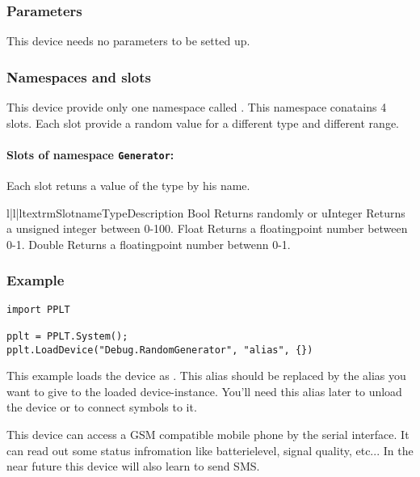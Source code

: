 \subsubsection{Parameters}
This device needs no parameters to be setted up. 

\subsubsection{Namespaces and slots}
This device provide only one namespace called . This 
namespace conatains 4 slots. Each slot provide a random value for a different
type and different range.

\paragraph{Slots of namespace \texttt{Generator}:}
Each slot retuns a value of the type by his name.
\begin{tableiii}{l|l|l}{textrm}{Slotname}{Type}{Description}
        {Bool}
        {Returns randomly  or }
        {uInteger}
        {Returns a unsigned integer between 0-100.}
        {Float}
        {Returns a floatingpoint number between 0-1.}
        {Double}
        {Returns a floatingpoint number betwenn 0-1.}
\end{tableiii}

\subsubsection{Example}
\begin{verbatim}
import PPLT

pplt = PPLT.System();
pplt.LoadDevice("Debug.RandomGenerator", "alias", {})
\end{verbatim}

This example loads the device as . This alias should be replaced
by the alias you want to give to the loaded device-instance. You'll need this 
alias later to unload the device or to connect symbols to it.









This device can access a GSM compatible mobile phone by the serial interface. 
It can read out some status infromation  like batterielevel, signal quality, 
etc... In the near future this device will also learn to send SMS. 

